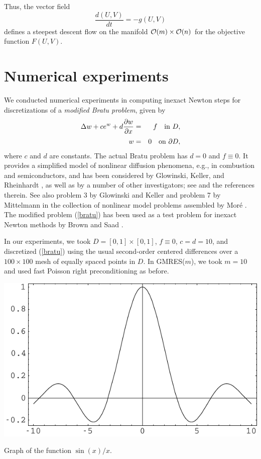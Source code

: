 \documentclass[myposter,portrait]{sciposter}
\def\mysection#1{
{\color{sectionCol}\section*{\sc\bfseries #1}}}
\begin{document}
\begin{multicols*}{3}
Thus, the vector field
\begin{equation}
\frac{d(U,V)}{dt} = -g(U,V) 	\label{eq2.15}
\end{equation}
defines a steepest descent flow on the manifold  ${\cal O} (m) \times
{\cal O} (n)$ for the objective function  $F(U,V)$.

\columnbreak 

\mysection{Numerical experiments} 

We conducted numerical experiments 
in computing inexact Newton steps for discretizations of a  
{\em modified Bratu problem}, given by  
\begin{eqnarray} 
{\displaystyle \Delta w + c e^w + d{ {\partial w}\over{\partial x} } } 
&=&{\displaystyle f \quad {\rm in}\ D, }\nonumber\\[-1.5ex]
\label{bratu} \\[-1.5ex]
{\displaystyle w }&=&{\displaystyle 0 \quad {\rm on}\ \partial D , } \nonumber
\end{eqnarray} 
where $c$ and $d$ are constants. The actual Bratu problem has $d=0$ and  
$f \equiv0$. It provides a simplified model of nonlinear diffusion  
phenomena, e.g., in combustion and semiconductors, and has been 
considered by Glowinski, Keller, and Rheinhardt \cite{GloKR85}, 
as well as by a number of other investigators; see \cite{GloKR85} 
and the references therein. See also problem 3 by Glowinski and  Keller  
and problem 7 by Mittelmann in the collection of nonlinear model 
problems assembled by Mor\'e \cite{More}. The modified problem  
(\ref{bratu}) has been used as a test problem for inexact Newton 
methods by Brown and Saad \cite{Brown-Saad1}.  

\def\gmres{{GMRES}} 
\def\gmresm{{\rm GMRES($m$)}} 

In our experiments, we took $D = [0,1]\times[0,1]$, $f \equiv0$, 
$c=d=10$, and discretized (\ref{bratu}) using the usual second-order 
centered differences over a $100\times100$ mesh of equally 
spaced points in $D$. In \gmres($m$), we took $m=10$ and used fast  
Poisson right preconditioning as before.

\bigskip 
\includegraphics[width=\columnwidth]{fig}
\caption{Graph of the function $\sin(x)/x$.} 
 




\end{multicols*}
\end{document}
